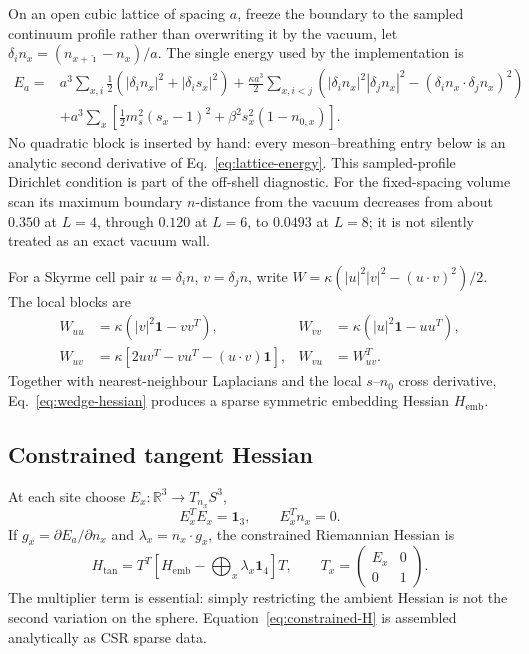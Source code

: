 \documentclass[11pt]{article}
\theoremstyle{definition}
\theoremstyle{remark}
\newcommand{\RR}{\mathbb R}
\newcommand{\one}{\mathbf 1}
\begin{document}
On an open cubic lattice of spacing \(a\), freeze the boundary to the sampled
continuum profile rather than overwriting it by the vacuum,
let \(\delta_i n_x=(n_{x+\hat\imath}-n_x)/a\).  The single energy used by
the implementation is
\begin{align}
 E_a={}&a^3\sum_{x,i}\frac12(|\delta_i n_x|^2+|\delta_i s_x|^2)
 +\frac{\kappa a^3}{2}\sum_{x,i<j}
 \left(|\delta_i n_x|^2|\delta_jn_x|^2
 -(\delta_i n_x\cdot\delta_jn_x)^2\right)\nonumber\\
 &+a^3\sum_x\left[\frac12m_s^2(s_x-1)^2
 +\beta^2s_x^2(1-n_{0,x})\right].
 \label{eq:lattice-energy}
\end{align}
No quadratic block is inserted by hand: every meson--breathing entry below
is an analytic second derivative of Eq.~\eqref{eq:lattice-energy}.
This sampled-profile Dirichlet condition is part of the off-shell diagnostic.
For the fixed-spacing volume scan its maximum boundary \(n\)-distance from the
vacuum decreases from about \(0.350\) at \(L=4\), through \(0.120\) at \(L=6\),
to \(0.0493\) at \(L=8\); it is not silently treated as an exact vacuum wall.

For a Skyrme cell pair \(u=\delta_i n\), \(v=\delta_j n\), write
\(W=\kappa(|u|^2|v|^2-(u\cdot v)^2)/2\).  The local blocks are
\begin{align}
 W_{uu}&=\kappa(|v|^2\one-vv^T),&
 W_{vv}&=\kappa(|u|^2\one-uu^T),\nonumber\\
 W_{uv}&=\kappa[2uv^T-vu^T-(u\cdot v)\one],&
 W_{vu}&=W_{uv}^T.
 \label{eq:wedge-hessian}
\end{align}
Together with nearest-neighbour Laplacians and the local \(s\)--\(n_0\)
cross derivative, Eq.~\eqref{eq:wedge-hessian} produces a sparse symmetric
embedding Hessian \(H_{\mathrm{emb}}\).

\subsection{Constrained tangent Hessian}

At each site choose \(E_x:\RR^3\to T_{n_x}S^3\),
\begin{equation}
 E_x^TE_x=\one_3,\qquad E_x^Tn_x=0.
\end{equation}
If \(g_x=\partial E_a/\partial n_x\) and
\(\lambda_x=n_x\cdot g_x\), the constrained Riemannian Hessian is
\begin{equation}
 H_{\mathrm{tan}}
 =T^T\left[H_{\mathrm{emb}}-\bigoplus_x
 \lambda_x\one_4\right]T,\qquad
 T_x=\begin{pmatrix}E_x&0\\0&1\end{pmatrix}.
 \label{eq:constrained-H}
\end{equation}
The multiplier term is essential: simply restricting the ambient Hessian is
not the second variation on the sphere.  Equation~\eqref{eq:constrained-H}
is assembled analytically as CSR sparse data.
\end{document}
